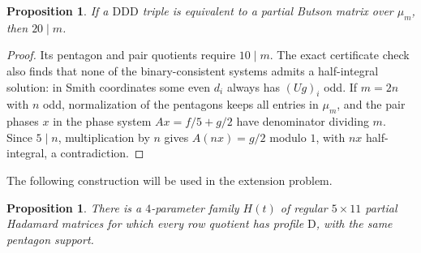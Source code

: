 \documentclass[11pt,a4paper]{article}
\newtheorem{proposition}[theorem]{Proposition}
\theoremstyle{plain}
\theoremstyle{definition}
\theoremstyle{plain}
\begin{document}
\par\addvspace{\medskipamount}\noindent
\begin{minipage}{\linewidth}
\begin{proposition}\label{n11_noA_DDD:rootobstruction}
If a $\mathrm{DDD}$ triple is equivalent to a partial Butson matrix over $\mu_m$, then $20\mid m$.
\end{proposition}
\end{minipage}
\par\addvspace{\medskipamount}

\begin{proof}
Its pentagon and pair quotients require $10\mid m$. The exact certificate check also finds that none of the binary-consistent systems admits a half-integral solution: in Smith coordinates some even $d_i$ always has $(Ug)_i$ odd. If $m=2n$ with $n$ odd, normalization of the pentagons keeps all entries in $\mu_m$, and the pair phases $x$ in the phase system $Ax=f/5+g/2$ have denominator dividing $m$. Since $5\mid n$, multiplication by $n$ gives $A(nx)=g/2$ modulo $1$, with $nx$ half-integral, a contradiction.
\end{proof}

\medskip\label{sec:DDD_five}
The following construction will be used in the extension problem.

\par\addvspace{\medskipamount}\noindent
\begin{minipage}{\linewidth}
\begin{proposition}\label{n11_DDD:fiveconstruction}
There is a $4$-parameter family $H(t)$ of regular $5\times11$ partial Hadamard matrices for which every row quotient has profile $\mathrm{D}$, with the same pentagon support.
\end{proposition}
\end{minipage}
\par\addvspace{\medskipamount}
\end{document}
